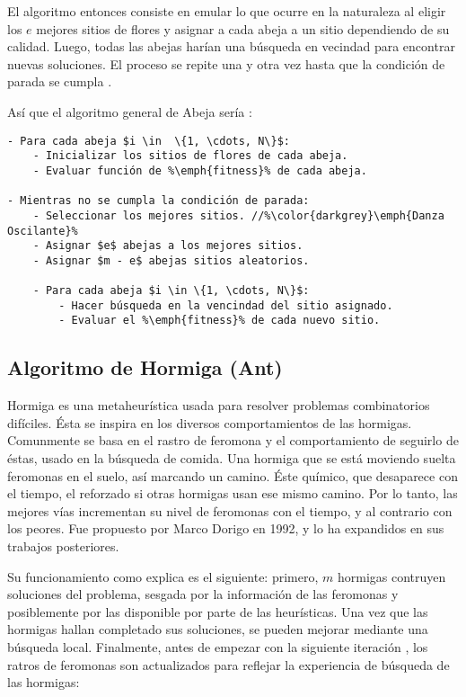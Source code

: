     El algoritmo entonces consiste en emular lo que ocurre en la naturaleza al
eligir los $e$ mejores sitios de flores y asignar a cada abeja a un sitio
dependiendo de su calidad. Luego, todas las abejas harían una búsqueda en
vecindad para encontrar nuevas soluciones. El proceso se repite una y otra vez
hasta que la condición de parada se cumpla \cite{BEE_0}.

    Así que el algoritmo general de Abeja sería \cite{BEE_0}:
\begin{lstlisting}[float=h, caption=Algoritmo General de Abeja]
- Para cada abeja $i \in  \{1, \cdots, N\}$:
    - Inicializar los sitios de flores de cada abeja.
    - Evaluar función de %\emph{fitness}% de cada abeja.

- Mientras no se cumpla la condición de parada:
    - Seleccionar los mejores sitios. //%\color{darkgrey}\emph{Danza Oscilante}%
    - Asignar $e$ abejas a los mejores sitios.
    - Asignar $m - e$ abejas sitios aleatorios.

    - Para cada abeja $i \in \{1, \cdots, N\}$:
        - Hacer búsqueda en la vencindad del sitio asignado.
        - Evaluar el %\emph{fitness}% de cada nuevo sitio.
\end{lstlisting}

\subsection{Algoritmo de Hormiga (Ant)}

Hormiga es una metaheurística usada para resolver problemas combinatorios
difíciles. \'Esta se inspira en los diversos comportamientos de las hormigas.
Comunmente se basa en el rastro de feromona y el comportamiento de seguirlo 
de éstas, usado en la búsqueda de comida. Una hormiga que se est\'a moviendo 
suelta feromonas en el suelo, as\'i marcando un camino. \'Este químico, que 
desaparece con el tiempo, el reforzado si otras hormigas usan ese mismo camino.
Por lo tanto, las mejores v\'ias incrementan su nivel de feromonas con el tiempo, 
y al contrario con los peores. Fue propuesto por Marco Dorigo en 1992, 
y lo ha expandidos en sus trabajos posteriores.
\cite{GePo2010} \cite{Le2007}

Su funcionamiento como explica \cite{GePo2010} es el siguiente: primero, $m$ hormigas contruyen
soluciones del problema, sesgada por la informaci\'on de las feromonas y posiblemente
por las disponible por parte de las heur\'isticas. Una vez que las hormigas hallan completado
sus soluciones, se pueden mejorar mediante una b\'usqueda local. Finalmente,
antes de empezar con la siguiente iteraci\'on , los ratros de feromonas son
actualizados para reflejar la experiencia de b\'usqueda de las hormigas:

